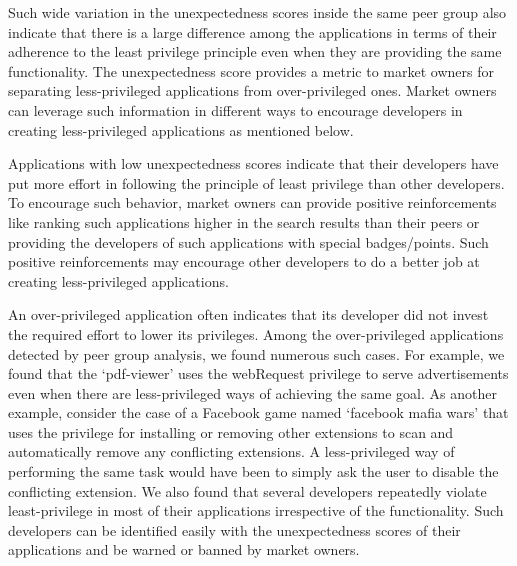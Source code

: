 Such wide variation in the unexpectedness scores inside the same peer group also indicate 
that there is a large difference among the applications in terms of their adherence to 
the least privilege principle even when they are providing the same functionality. 
The unexpectedness score provides a metric to market owners for separating 
less-privileged applications from over-privileged ones. Market owners can leverage 
such information in different ways to encourage developers in creating less-privileged 
applications as mentioned below.
 
 Applications with low unexpectedness
scores indicate that their developers have put more effort in following the principle of least privilege 
than other developers. To encourage such behavior, market owners can provide positive reinforcements like ranking such applications 
higher in the search results than their peers or providing the developers of such applications 
with special badges/points. Such positive reinforcements may encourage other developers 
to do a better job at creating less-privileged applications.

 An over-privileged application often 
indicates that its developer did not invest the required effort to lower its privileges. 
Among the over-privileged applications detected by peer group analysis, we found numerous 
such cases. For example, we found that the `pdf-viewer' uses the webRequest privilege to serve 
advertisements even when there are less-privileged ways of achieving the same goal.
As another example, consider the case of a Facebook game named `facebook mafia wars' that 
uses the privilege for installing or removing other extensions to scan and automatically 
remove any conflicting extensions. A less-privileged way of performing the same task would  
have been to simply ask the user to disable the conflicting extension. We also found that several 
developers repeatedly violate least-privilege in most of their applications irrespective of the 
functionality. Such developers can be identified easily with the unexpectedness scores of their 
applications and be warned or banned by market owners. 



